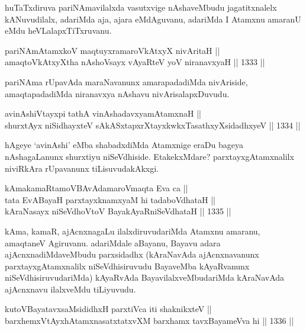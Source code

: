 \begin{artha}
huTaTxdiruva pariNAmavilalxda vasutxvige nAshaveMbudu jagatitxnalelx kANuvudilalx, adariMda aja, ajara eMdAguvanu, adariMda I Atamxnu amaranU eMdu heVLalapxTiTxruvanu.
\end{artha}


\begin{shl}
pariNAmAtamxkoV maqtuyxramaroVkAtxyX nivAritaH || \\
amaqtoVkAtxyX\s tha nAshoV\s sayx vAyaRteV yoV niranavxyaH \hfill || 1333 ||  
\end{shl}

\begin{artha}
pariNAma rUpavAda maraNavanunx amarapadadiMda nivAriside, amaqtapadadiMda niranavxya nAshavu nivArisalapxDuvudu.
\end{artha}

\begin{shl}
avinAshiVtayxpi tathA vinAshadavxyamAtamxnaH || \\
shurxtAyx niSidhayxteV sAkASxtapxrXtayxkwkxTasathxyXsidadhxyeV \hfill || 1334 ||  
\end{shl}

\begin{artha}
hAgeye `avinAshi' eMba shabadxdiMda Atamxnige eraDu bageya nAshagaLanunx shurxtiyu niSeVdhiside. EtakekxMdare? parxtayxgAtamxnalilx niviRkAra rUpavanunx tiLisuvudakAkxgi.
\end{artha}

\begin{shl}
kAmakamaRtamoVBAvAdamaroV\s maqta Eva ca || \\
tata EvABayaH parxtayxknamxyaM hi tadaboVdhataH || \\
kAraNasayx niSeVdhoV\s toV BayakAyaRniSeVdhataH \hfill || 1335 ||  
\end{shl}

\begin{artha}
kAma, kamaR, ajAcnxnagaLu ilalxdiruvudariMda Atamxnu amaranu, amaqtaneV Agiruvanu. adariMdale aBayanu, Bayavu adara ajAcnxnadiMdaveMbudu parxsidadhx (kAraNavAda ajAcnxnavanunx parxtayxgAtamxnalilx niSeVdhisiruvudu BayaveMba kAyaRvanunx niSeVdhisiruvudariMda) kAyaRvAda BayavilalxveMbudariMda kAraNavAda ajAcnxnavu ilalxveMdu tiLiyuvudu.
\end{artha}

\begin{shl}
kutoV\s BayatavxsaMsididhxH parxtiVca iti shaknikxteV || \\
barxhemxVtAyxhA\s \s tamxnasatxtatxvXM barxhamx tavxBayameVva hi \hfill || 1336 ||  
\end{shl}

